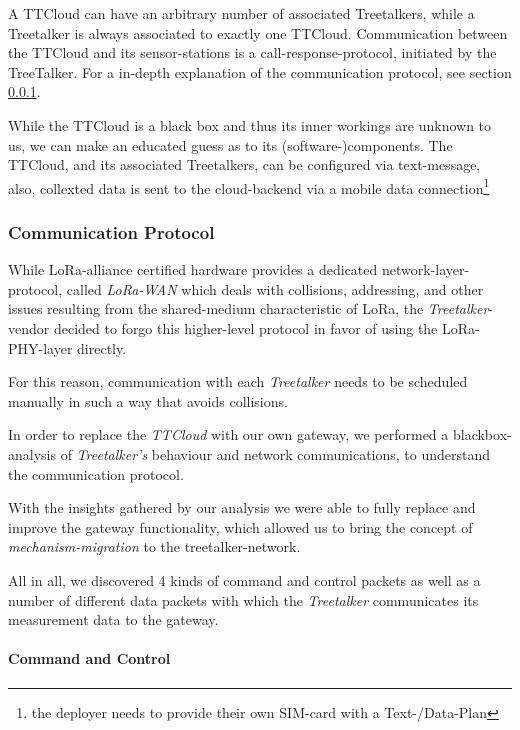 A TTCloud can have an arbitrary number of associated Treetalkers, while a Treetalker is always associated to exactly one TTCloud.
Communication between the TTCloud and its sensor-stations is a call-response-protocol, initiated by the TreeTalker.
For a in-depth explanation of the communication protocol, see section \ref{sec:implementation:treetalker:protocol}.

While the TTCloud is a black box and thus its inner workings are unknown to us, we can make an educated guess as to its (software-)components.
The TTCloud, and its associated Treetalkers, can be configured via text-message, also, collexted data is sent to the cloud-backend via a mobile data connection\footnote{the deployer needs to provide their own SIM-card with a Text-/Data-Plan}

\subsubsection{Communication Protocol}
\label{sec:implementation:treetalker:protocol}

While LoRa-alliance certified hardware provides a dedicated network-layer-protocol, called \textit{LoRa-WAN} which deals with collisions, addressing, and other issues resulting from the shared-medium characteristic of LoRa, the \textit{Treetalker}-vendor decided to forgo this higher-level protocol in favor of using the LoRa-PHY-layer directly.

For this reason, communication with each \textit{Treetalker} needs to be scheduled manually in such a way that avoids collisions.

In order to replace the \textit{TTCloud} with our own gateway, we performed a blackbox-analysis of \textit{Treetalker's} behaviour and network communications, to understand the communication protocol.

With the insights gathered by our analysis we were able to fully replace and improve the gateway functionality, which allowed us to bring the concept of \textit{mechanism-migration} to the treetalker-network.

All in all, we discovered 4 kinds of command and control packets as well as a number of different data packets with which the \textit{Treetalker} communicates its measurement data to the gateway.

\paragraph{Command and Control}

